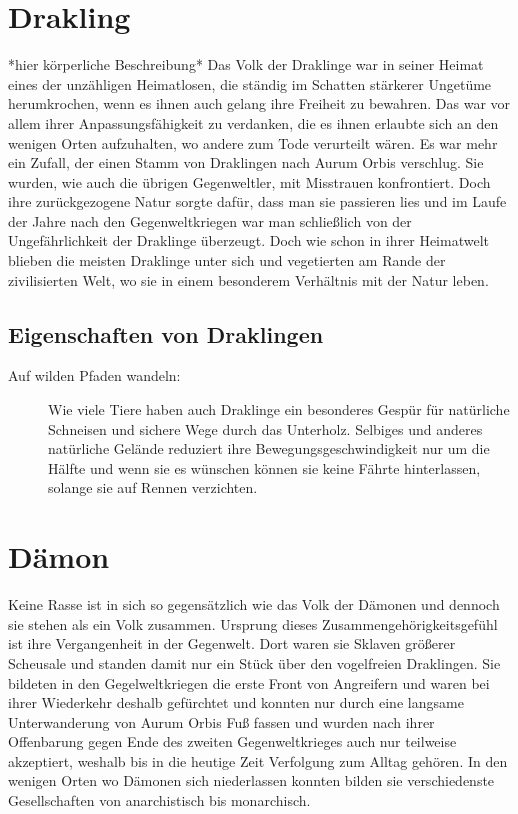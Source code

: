 \documentclass[a4paper,12pt,oneside]{book}
\begin{document}
\section{Drakling}\label{Drakling}
*hier körperliche Beschreibung*
Das Volk der Draklinge war in seiner Heimat eines der unzähligen Heimatlosen, die ständig im Schatten stärkerer Ungetüme herumkrochen, wenn es ihnen auch gelang ihre Freiheit zu bewahren. Das war vor allem ihrer Anpassungsfähigkeit zu verdanken, die es ihnen erlaubte sich an den wenigen Orten aufzuhalten, wo andere zum Tode verurteilt wären. Es war mehr ein Zufall, der einen Stamm von Draklingen nach Aurum Orbis verschlug. Sie wurden, wie auch die übrigen Gegenweltler, mit Misstrauen konfrontiert. Doch ihre zurückgezogene Natur sorgte dafür, dass man sie passieren lies und im Laufe der Jahre nach den Gegenweltkriegen war man schließlich von der Ungefährlichkeit der Draklinge überzeugt. Doch wie schon in ihrer Heimatwelt blieben die meisten Draklinge unter sich und vegetierten am Rande der zivilisierten Welt, wo sie in einem besonderem Verhältnis mit der Natur leben.
\subsection{Eigenschaften von Draklingen}
\begin{description}
\item[Auf wilden Pfaden wandeln:]
Wie viele Tiere haben auch Draklinge ein besonderes Gespür für natürliche Schneisen und sichere Wege durch das Unterholz. Selbiges und anderes natürliche Gelände reduziert ihre Bewegungsgeschwindigkeit nur um die Hälfte und wenn sie es wünschen können sie keine Fährte hinterlassen, solange sie auf Rennen verzichten.

\end{description}

\section{Dämon}\label{Daemon}
Keine Rasse ist in sich so gegensätzlich wie das Volk der Dämonen und dennoch sie stehen als ein Volk zusammen. Ursprung dieses Zusammengehörigkeitsgefühl ist ihre Vergangenheit in der Gegenwelt. Dort waren sie Sklaven größerer Scheusale und standen damit nur ein Stück über den vogelfreien Draklingen. Sie bildeten in den Gegelweltkriegen die erste Front von Angreifern und waren bei ihrer Wiederkehr deshalb gefürchtet und konnten nur durch eine langsame Unterwanderung von Aurum Orbis Fuß fassen und wurden nach ihrer Offenbarung gegen Ende des zweiten Gegenweltkrieges auch nur teilweise akzeptiert, weshalb bis in die heutige Zeit Verfolgung zum Alltag gehören. In den wenigen Orten wo Dämonen sich niederlassen konnten bilden sie verschiedenste Gesellschaften von anarchistisch bis monarchisch.
\end{document}
